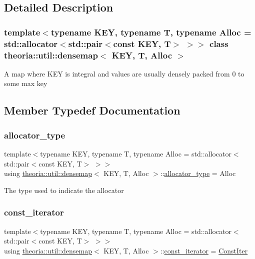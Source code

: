\subsection{Detailed Description}
\subsubsection*{template$<$typename K\+EY, typename T, typename Alloc = std\+::allocator$<$std\+::pair$<$const K\+E\+Y, T$>$ $>$$>$\newline
class theoria\+::util\+::densemap$<$ K\+E\+Y, T, Alloc $>$}

A map where K\+EY is integral and values are usually densely packed from 0 to some max key 

\subsection{Member Typedef Documentation}
\mbox{\label{classtheoria_1_1util_1_1densemap_ae12f4688e504c8759e23759ad7272c94}} 
\subsubsection{\texorpdfstring{allocator\+\_\+type}{allocator\_type}}
{\footnotesize\ttfamily template$<$typename K\+EY, typename T, typename Alloc = std\+::allocator$<$std\+::pair$<$const K\+E\+Y, T$>$ $>$$>$ \\
using \hyperlink{classtheoria_1_1util_1_1densemap}{theoria\+::util\+::densemap}$<$ K\+EY, T, Alloc $>$\+::\hyperlink{classtheoria_1_1util_1_1densemap_ae12f4688e504c8759e23759ad7272c94}{allocator\+\_\+type} =  Alloc}

The type used to indicate the allocator \mbox{\label{classtheoria_1_1util_1_1densemap_a8c2937f8e4ba47abf344d9f9f23f0c88}} 
\subsubsection{\texorpdfstring{const\+\_\+iterator}{const\_iterator}}
{\footnotesize\ttfamily template$<$typename K\+EY, typename T, typename Alloc = std\+::allocator$<$std\+::pair$<$const K\+E\+Y, T$>$ $>$$>$ \\
using \hyperlink{classtheoria_1_1util_1_1densemap}{theoria\+::util\+::densemap}$<$ K\+EY, T, Alloc $>$\+::\hyperlink{classtheoria_1_1util_1_1densemap_a8c2937f8e4ba47abf344d9f9f23f0c88}{const\+\_\+iterator} =  \hyperlink{classtheoria_1_1util_1_1densemap_1_1ConstIter}{Const\+Iter}}

